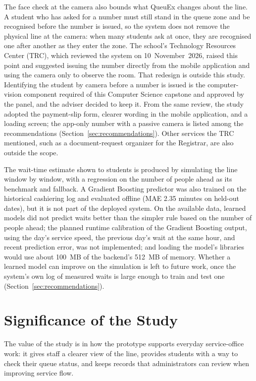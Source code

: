 \documentclass{research}
\newcommand{\sysname}{QueuEx}
\begin{document}
\label{cr:trc-scope}The face check at the camera also bounds what \sysname{} changes about
the line. A student who has asked for a number must still stand in the
queue zone and be recognised before the number is issued, so the system
does not remove the physical line at the camera: when many students ask
at once, they are recognised one after another as they enter the zone.
The school's Technology Resources Center (TRC), which reviewed the system
on 10~November~2026, raised this point and suggested issuing the number
directly from the mobile application and using the camera only to
observe the room. That redesign is outside this study. Identifying the
student by camera before a number is issued is the computer-vision
component required of this Computer Science capstone and approved by the
panel, and the adviser decided to keep it. From the same review, the
study adopted the payment-slip form, clearer wording in the mobile
application, and a loading screen; the app-only number with a passive
camera is listed among the recommendations
(Section~\ref{sec:recommendations}). Other services the TRC mentioned,
such as a document-request organizer for the Registrar, are also outside
the scope.

\label{cr:gb-scope}The wait-time estimate shown to students is produced by simulating the
line window by window, with a regression on the number of people ahead
as its benchmark and fallback. A Gradient Boosting predictor was also
trained on the historical cashiering log and evaluated offline (MAE 2.35
minutes on held-out dates), but it is not part of the deployed system.
On the available data, learned models did not predict waits better than
the simpler rule based on the number of people ahead; the planned
runtime calibration of the Gradient Boosting output, using the day's
service speed, the previous day's wait at the same hour, and recent
prediction error, was not implemented; and loading the model's
libraries would use about 100~MB of the backend's 512~MB of memory.
Whether a learned model can improve on the simulation is left to future
work, once the system's own log of measured waits is large enough to
train and test one (Section~\ref{sec:recommendations}).

\section{Significance of the Study}

The value of the study is in how the prototype supports everyday
service-office work: it gives staff a clearer view of the line,
provides students with a way to check their queue status, and keeps
records that administrators can review when improving service flow.
\end{document}
